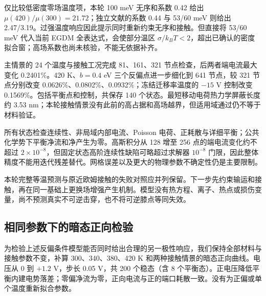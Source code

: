\documentclass[11pt,a4paper]{article}
\begin{document}
{\cjkfont 仅比较低密度零场温度项，本轮}\allowbreak{} 100 meV {\cjkfont 无序和系数}\allowbreak{} 0.42 {\cjkfont 给出}\allowbreak{} $\mu(420)/\mu(300)=21.72${\cjkfont ；独立文献的系数}\allowbreak{} 0.44 {\cjkfont 与}\allowbreak{} 53/60 meV {\cjkfont 则给出}\allowbreak{} 2.47/3.19{\cjkfont 。过强温度响应因此提示同时重新约束无序和接触。但直接将}\allowbreak{} 53/60 meV {\cjkfont 代入当前}\allowbreak{} EGDM {\cjkfont 全表达式，会使部分温区}\allowbreak{} $\sigma/k_BT<2${\cjkfont ，超出已确认的密度拟合窗；高场系数也尚未核验，不能无依据补齐。}\allowbreak{}

{\cjkfont 主情景的}\allowbreak{} 24 {\cjkfont 个温度与接触工况完成}\allowbreak{} 81{\cjkfont 、}\allowbreak{}161{\cjkfont 、}\allowbreak{}321 {\cjkfont 节点检查，后两者端电流最大变化}\allowbreak{} 0.2401\%{\cjkfont 。}\allowbreak{}420 K{\cjkfont 、}\allowbreak{}$b=0.4$ eV {\cjkfont 三个反偏点进一步细化到}\allowbreak{} 641 {\cjkfont 节点，较}\allowbreak{} 321 {\cjkfont 节点分别改变}\allowbreak{} 0.0626\%{\cjkfont 、}\allowbreak{}0.0802\%{\cjkfont 、}\allowbreak{}0.0932\%{\cjkfont ；冻结迁移率温度的}\allowbreak{} $-15$ V {\cjkfont 控制改变}\allowbreak{} 0.1569\%{\cjkfont 。包括平衡点和控制，共保存}\allowbreak{} 140 {\cjkfont 个状态。最短移动电荷热力学屏蔽长度约}\allowbreak{} 3.53 nm{\cjkfont ；本轮接触情景没有此前的高占据和高场越界，但适用域通过仍不等于材料验证。}\allowbreak{}

{\cjkfont 所有状态检查连续性、非局域内部电流、}\allowbreak{}Poisson {\cjkfont 电荷、正耗散与详细平衡；公共化学势下平衡净流和净产生为零。高斯积分从}\allowbreak{} 128 {\cjkfont 增至}\allowbreak{} 256 {\cjkfont 点的端电流变化约不超过}\allowbreak{} $2\times10^{-8}${\cjkfont ，但固定状态高阶连续性缺陷可略超过求解器}\allowbreak{} $10^{-8}$ {\cjkfont 门限，因此整体精度不能用迭代残差替代。网格误差以及更大的物理参数不确定性仍是主要限制。}\allowbreak{}

{\cjkfont 本轮完整等温预测与原近欧姆接触的失败对照应并列保留。下一步先约束输运和接触，再在同一基础上更换场增强产生机制。模型没有热方程、离子、热点或损伤变量，尚不预测真实不可逆击穿，也不将可逆膝点等同失效。}\allowbreak{}


\subsection{{\cjkfont 相同参数下的暗态正向检验}\allowbreak{}}
{\cjkfont 为检验上述反偏条件模型能否同时给出合理的另一极性响应，我们保持全部材料与接触参数不变，补算}\allowbreak{} 300{\cjkfont 、}\allowbreak{}340{\cjkfont 、}\allowbreak{}380{\cjkfont 、}\allowbreak{}420 K {\cjkfont 和两种接触情景的暗态正向曲线。电压从}\allowbreak{} 0 {\cjkfont 到}\allowbreak{} $+1.2$ V{\cjkfont ，步长}\allowbreak{} 0.05 V{\cjkfont ，共}\allowbreak{} 200 {\cjkfont 个稳态（含}\allowbreak{} 8 {\cjkfont 个平衡态）。正电压降低平衡内建电势落差；零偏净流为零，正向电流与正的端口耗散一致。没有为正偏或单个温度重新拟合参数。}\allowbreak{}
\end{document}
